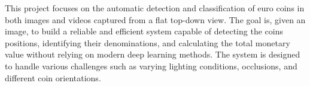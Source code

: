 This project focuses on the automatic detection and classification of euro coins in both images and videos captured from a flat top-down view.
The goal is, given an image, to build a reliable and efficient system capable of detecting the coins positions, identifying their denominations, and calculating the total monetary value without relying on modern deep learning methods.
The system is designed to handle various challenges such as varying lighting conditions, occlusions, and different coin orientations.



